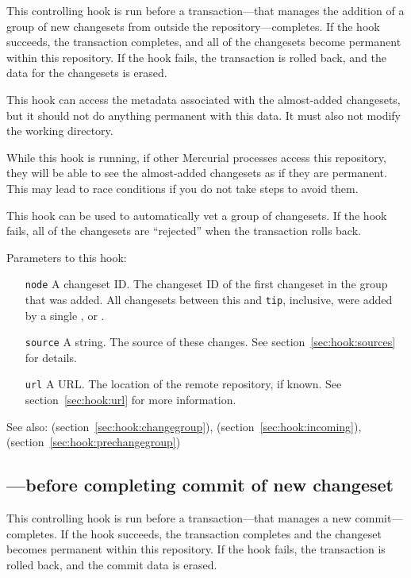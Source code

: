 This controlling hook is run before a transaction---that manages the
addition of a group of new changesets from outside the
repository---completes.  If the hook succeeds, the transaction
completes, and all of the changesets become permanent within this
repository.  If the hook fails, the transaction is rolled back, and
the data for the changesets is erased.

This hook can access the metadata associated with the almost-added
changesets, but it should not do anything permanent with this data.
It must also not modify the working directory.

While this hook is running, if other Mercurial processes access this
repository, they will be able to see the almost-added changesets as if
they are permanent.  This may lead to race conditions if you do not
take steps to avoid them.

This hook can be used to automatically vet a group of changesets.  If
the hook fails, all of the changesets are ``rejected'' when the
transaction rolls back.

Parameters to this hook:
\begin{itemize}
\item[\texttt{node}] A changeset ID.  The changeset ID of the first
  changeset in the group that was added.  All changesets between this
  and \texttt{tip}, inclusive, were added by
  a single ,  or .
\item[\texttt{source}] A string.  The source of these changes.  See
  section~\ref{sec:hook:sources} for details.
\item[\texttt{url}] A URL.  The location of the remote repository, if
  known.  See section~\ref{sec:hook:url} for more information.
\end{itemize}

See also:  (section~\ref{sec:hook:changegroup}),
 (section~\ref{sec:hook:incoming}),
 (section~\ref{sec:hook:prechangegroup})

\subsection{---before completing commit of new changeset}
\label{sec:hook:pretxncommit}

This controlling hook is run before a transaction---that manages a new
commit---completes.  If the hook succeeds, the transaction completes
and the changeset becomes permanent within this repository.  If the
hook fails, the transaction is rolled back, and the commit data is
erased.

